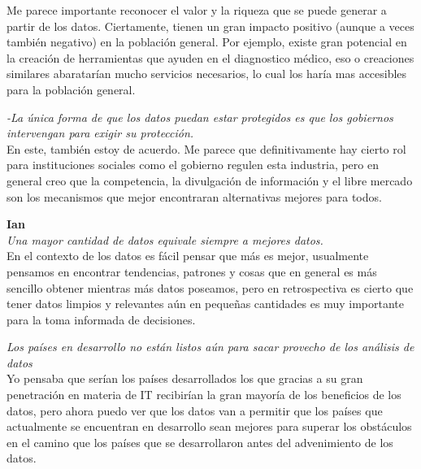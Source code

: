 \documentclass[12pt,a4paper]{article}
\begin{document}
\begin{enumerate}
\begin{enumerate}
				Me parece importante reconocer el valor y la riqueza que se puede generar a partir de los datos. Ciertamente, tienen un gran impacto positivo (aunque a veces también negativo) en la población general.
Por ejemplo, existe gran potencial en la creación de herramientas que ayuden en el diagnostico médico, eso o creaciones similares abaratarían mucho servicios necesarios, lo cual los haría mas accesibles para la población general.


				\textit {-La única forma de que los datos puedan estar
protegidos es que los gobiernos intervengan
para exigir su protección.} \\

			En este, también estoy de acuerdo. Me parece que definitivamente hay cierto rol para instituciones sociales como el gobierno regulen esta industria, pero en general creo que la competencia, la divulgación de información y el libre mercado son los mecanismos que mejor encontraran alternativas mejores para todos.

				\textbf{Ian}\\
				\textit {Una mayor cantidad de datos equivale siempre a mejores datos.} \\

				En el contexto de los datos es fácil pensar que más es mejor, usualmente
				pensamos en encontrar tendencias, patrones y cosas que en general
				es más sencillo obtener mientras más datos poseamos, pero en retrospectiva
				es cierto que tener datos limpios y relevantes aún en pequeñas cantidades
				es muy importante para la toma informada de decisiones.

				\textit {Los países en desarrollo no están listos aún para sacar provecho de los análisis de datos} \\

				Yo pensaba que serían los países desarrollados los que gracias a
				su gran penetración en materia de IT recibirían la gran mayoría
				de los beneficios de los datos, pero ahora puedo ver que los datos
				van a permitir que los países que actualmente se encuentran en desarrollo
				sean mejores para superar los obstáculos en el camino que los países
				que se desarrollaron antes del advenimiento de los datos.	
				
		\end{enumerate}

\end{enumerate}
\end{document}
